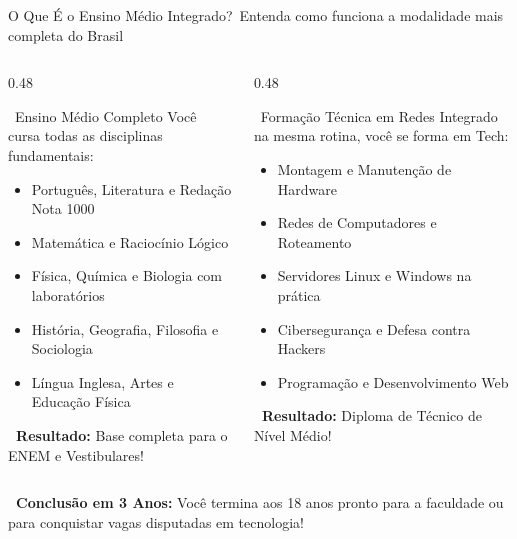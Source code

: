 \begin{frame}{O Que É o Ensino Médio Integrado?}{\faLayerGroup\ Entenda como funciona a modalidade mais completa do Brasil}
  \begin{columns}[t]
    \begin{column}{0.48\textwidth}
      \begin{bluecard}{\faBookOpen\ Ensino Médio Completo}
        \tiny
        Você cursa todas as disciplinas fundamentais:
        \begin{itemize}\setlength{\itemsep}{0.12em}
          \item Português, Literatura e Redação Nota 1000
          \item Matemática e Raciocínio Lógico
          \item Física, Química e Biologia com laboratórios
          \item História, Geografia, Filosofia e Sociologia
          \item Língua Inglesa, Artes e Educação Física
        \end{itemize}
        \textbf{\textcolor{NetBlue}{\faCheckDouble\ Resultado:}} Base completa para o ENEM e Vestibulares!
      \end{bluecard}
    \end{column}
    
    \begin{column}{0.48\textwidth}
      \begin{purplecard}{\faNetworkWired\ Formação Técnica em Redes}
        \tiny
        Integrado na mesma rotina, você se forma em Tech:
        \begin{itemize}\setlength{\itemsep}{0.12em}
          \item Montagem e Manutenção de Hardware
          \item Redes de Computadores e Roteamento
          \item Servidores Linux e Windows na prática
          \item Cibersegurança e Defesa contra Hackers
          \item Programação e Desenvolvimento Web
        \end{itemize}
        \textbf{\textcolor{CyberPurple}{\faAward\ Resultado:}} Diploma de Técnico de Nível Médio!
      \end{purplecard}
    \end{column}
  \end{columns}
  
  \vspace{0.08cm}
  \begin{statcard}
    \tiny \textcolor{IFCEDarkGreen}{\textbf{\faGraduationCap\ Conclusão em 3 Anos:} Você termina aos 18 anos pronto para a faculdade ou para conquistar vagas disputadas em tecnologia!}
  \end{statcard}
\end{frame}
